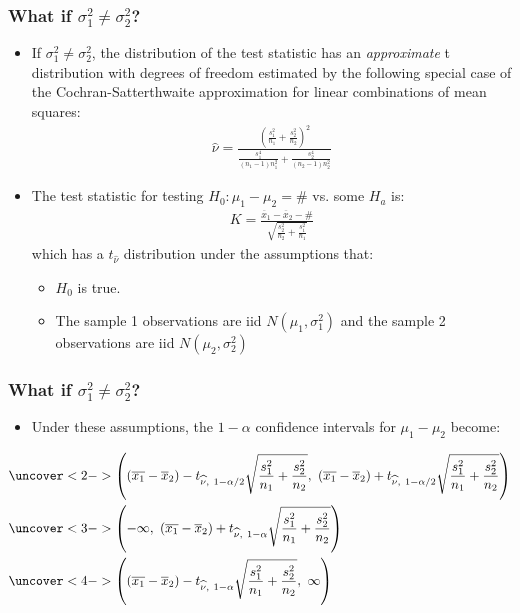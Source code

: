 \documentclass[handout]{beamer}\usepackage{graphicx, color}
\providecommand{\ov}[1]{\overline{#1}}
\providecommand{\wh}[1]{\widehat{#1}}
\numberwithin{equation}{section}
\begin{document}
\begin{frame}
\frametitle{What if $\sigma_1^2 \ne \sigma_2^2$?} \small
\begin{itemize}
\item If $\sigma_1^2 \ne \sigma_2^2$, the distribution of the test statistic has an \emph{approximate} t distribution with degrees of freedom estimated by the following special case of the Cochran-Satterthwaite approximation for linear combinations of mean squares:
\pause \begin{align*}
\wh{\nu} = \frac{\left (\frac{s_1^2}{n_1} + \frac{s_2^2}{n_2} \right )^2}{\frac{s_1^4}{(n_1 - 1)n_1^2} + \frac{s_2^4}{(n_2 - 1)n_2^2}}
\end{align*}
\pause \item The test statistic for testing $H_0: \mu_1 - \mu_2 = \#$ vs. some $H_a$ is:
\pause \begin{align*}
K = \frac{\ov{x}_1 - \ov{x}_2 - \#}{\sqrt{\frac{s_2^2}{n_2} + \frac{s_1^2}{n_1}}}
\end{align*}
which has a $t_{\wh{\nu}}$ distribution under the assumptions that:
\begin{itemize}
\pause \item $H_0$ is true.
\pause \item The sample 1 observations are iid $N(\mu_1, \sigma^2_1)$ and the sample 2 observations are iid $N(\mu_2, \sigma^2_2)$
\end{itemize}
\end{itemize}
\end{frame}


\begin{frame}
\frametitle{What if $\sigma_1^2 \ne \sigma_2^2$?} \scriptsize
\begin{itemize}
\item Under these assumptions, the $1 - \alpha$ confidence intervals for $\mu_1 - \mu_2$ become:
\end{itemize}
\begin{align*}
&\uncover<2->{\left ((\ov{x_1} - \ov{x}_2) - t_{\wh{\nu}, \ 1 - \alpha/2}  \sqrt{\frac{s_1^2}{n_1} + \frac{s_2^2}{n_2}} , \ (\ov{x_1} - \ov{x}_2) + t_{\wh{\nu}, \ 1 - \alpha/2} \sqrt{\frac{s_1^2}{n_1} + \frac{s_2^2}{n_2}} \right )} \\
&\uncover<3->{\left (-\infty , \ (\ov{x_1} - \ov{x}_2) + t_{\wh{\nu}, \ 1 - \alpha} \sqrt{\frac{s_1^2}{n_1} + \frac{s_2^2}{n_2}} \right )} \\
&\uncover<4->{\left ((\ov{x_1} - \ov{x}_2) - t_{\wh{\nu}, \ 1 - \alpha} \sqrt{\frac{s_1^2}{n_1} + \frac{s_2^2}{n_2}}, \ \infty \right ) }
\end{align*}
\end{frame}
\end{document}
